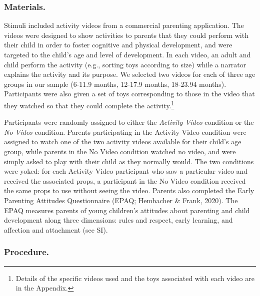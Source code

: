 \documentclass[man,floatsintext]{apa6}
\begin{document}
\hypertarget{materials.}{%
\subsubsection{Materials.}\label{materials.}}

Stimuli included activity videos from a commercial parenting application.
The videos were designed to show activities to parents that they could perform with their child in order to foster cognitive and physical development, and were targeted to the child's age and level of development.
In each video, an adult and child perform the activity (e.g., sorting toys according to size) while a narrator explains the activity and its purpose.
We selected two videos for each of three age groups in our sample (6-11.9 months, 12-17.9 months, 18-23.94 months).
Participants were also given a set of toys corresponding to those in the video that they watched so that they could complete the activity.\footnote{Details of the specific videos used and the toys associated with each video are in the Appendix.}

Participants were randomly assigned to either the \emph{Activity Video} condition or the \emph{No Video} condition.
Parents participating in the Activity Video condition were assigned to watch one of the two activity videos available for their child's age group, while parents in the No Video condition watched no video, and were simply asked to play with their child as they normally would.
The two conditions were yoked: for each Activity Video participant who saw a particular video and received the associated props, a participant in the No Video condition received the same props to use without seeing the video.
Parents also completed the Early Parenting Attitudes Questionnaire (EPAQ; Hembacher \& Frank, 2020).
The EPAQ measures parents of young children's attitudes about parenting and child development along three dimensions: rules and respect, early learning, and affection and attachment (see SI).

\hypertarget{procedure.}{%
\subsubsection{Procedure.}\label{procedure.}}
\end{document}
